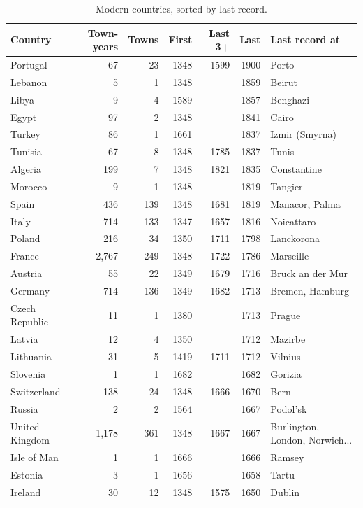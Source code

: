 \documentclass[11pt,a4paper]{article}
\begin{document}
\begin{table}[tbp]\centering\small\caption{Modern countries, sorted by last record.}\label{tab:countries}\setlength{\tabcolsep}{4pt}\begin{tabular}{lrrrrrl}\toprule Country & Town-years & Towns & First & Last 3+ & Last & Last record at\\\midrule
Portugal & 67 & 23 & 1348 & 1599 & 1900 & Porto\\
Lebanon & 5 & 1 & 1348 &  & 1859 & Beirut\\
Libya & 9 & 4 & 1589 &  & 1857 & Benghazi\\
Egypt & 97 & 2 & 1348 &  & 1841 & Cairo\\
Turkey & 86 & 1 & 1661 &  & 1837 & Izmir (Smyrna)\\
Tunisia & 67 & 8 & 1348 & 1785 & 1837 & Tunis\\
Algeria & 199 & 7 & 1348 & 1821 & 1835 & Constantine\\
Morocco & 9 & 1 & 1348 &  & 1819 & Tangier\\
Spain & 436 & 139 & 1348 & 1681 & 1819 & Manacor, Palma\\
Italy & 714 & 133 & 1347 & 1657 & 1816 & Noicattaro\\
Poland & 216 & 34 & 1350 & 1711 & 1798 & Lanckorona\\
France & 2,767 & 249 & 1348 & 1722 & 1786 & Marseille\\
Austria & 55 & 22 & 1349 & 1679 & 1716 & Bruck an der Mur\\
Germany & 714 & 136 & 1349 & 1682 & 1713 & Bremen, Hamburg\\
Czech Republic & 11 & 1 & 1380 &  & 1713 & Prague\\
Latvia & 12 & 4 & 1350 &  & 1712 & Mazirbe\\
Lithuania & 31 & 5 & 1419 & 1711 & 1712 & Vilnius\\
Slovenia & 1 & 1 & 1682 &  & 1682 & Gorizia\\
Switzerland & 138 & 24 & 1348 & 1666 & 1670 & Bern\\
Russia & 2 & 2 & 1564 &  & 1667 & Podol'sk\\
United Kingdom & 1,178 & 361 & 1348 & 1667 & 1667 & Burlington, London, Norwich...\\
Isle of Man & 1 & 1 & 1666 &  & 1666 & Ramsey\\
Estonia & 3 & 1 & 1656 &  & 1658 & Tartu\\
Ireland & 30 & 12 & 1348 & 1575 & 1650 & Dublin\\
\bottomrule\end{tabular}\end{table}
\end{document}
